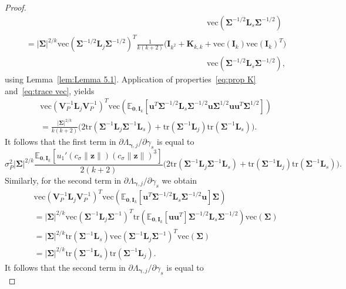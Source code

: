\documentclass{article}
\numberwithin{equation}{section}
\theoremstyle{plain}
\newcommand{\vc}{\mathrm{vec}}
\newcommand{\bgamma}{\bm\gamma}
\newcommand{\bSigma}{\mathbf{\Sigma}}
\newcommand{\bu}{\mathbf{u}}
\newcommand{\bz}{\mathbf{z}}
\newcommand{\bV}{\mathbf{V}}
\newcommand{\bI}{\mathbf{I}}
\newcommand{\bL}{\mathbf{L}}
\newcommand{\bK}{\mathbf{K}}
\newcommand{\E}{\mathbb{E}}
\begin{document}
\begin{proof}
\[\begin{split}
&\qquad\qquad\qquad\qquad\qquad\qquad\qquad\qquad\qquad\qquad\qquad
\vc\left(\bSigma^{-1/2}\bL_s\bSigma^{-1/2}\right)
\\
&=
|\bSigma|^{2/k}
\vc(\bSigma^{-1/2}\bL_j\bSigma^{-1/2})^T
\frac{1}{k(k+2)}
\Big(
\bI_{k^2}+\bK_{k,k}
+
\vc(\bI_k)\vc(\bI_k)^T
\Big)\\
&\qquad\qquad\qquad\qquad\qquad\qquad\qquad\qquad\qquad\qquad\qquad
\vc\left(\bSigma^{-1/2}\bL_s\bSigma^{-1/2}\right),
\end{split}
\]
using Lemma~\ref{lem:Lemma 5.1}.
Application of properties~\eqref{eq:prop K} and~\eqref{eq:trace vec}, yields
\[
\begin{split}
&
\vc(\bV_P^{-1}\bL_j\bV_P^{-1})^T
\vc\left(
\E_{\mathbf{0},\bI_k}
\left[
\bu^T\bSigma^{-1/2}\bL_s\bSigma^{-1/2}\bu
\bSigma^{1/2}\bu\bu^T\bSigma^{1/2}
\right]
\right)\\
&=
\frac{|\bSigma|^{2/k}}{k(k+2)}
\Big(
2\text{tr}(\bSigma^{-1}\bL_j\bSigma^{-1}\bL_s)
+
\text{tr}(\bSigma^{-1}\bL_j)\text{tr}(\bSigma^{-1}\bL_s)
\Big).
\end{split}
\]
It follows that the first term in $\partial\Lambda_{\bgamma,j}/\partial\gamma_s$ is equal to
\begin{equation}
\label{eq:first term}
\sigma_P^2
|\bSigma|^{2/k}
\frac{\E_{\mathbf{0},\bI_k}
\left[
u_1'(c_\sigma\|\bz\|)(c_\sigma\|\bz\|)^3
\right]}{2(k+2)}
\Big(
2\text{tr}(\bSigma^{-1}\bL_j\bSigma^{-1}\bL_s)+\text{tr}(\bSigma^{-1}\bL_j)\text{tr}(\bSigma^{-1}\bL_s)
\Big).
\end{equation}
Similarly, for the second term in $\partial\Lambda_{\bgamma,j}/\partial\gamma_s$
we obtain
\[
\begin{split}
&
\vc\left(\bV_P^{-1}\bL_j\bV_P^{-1}\right)^T
\vc\left(\E_{\mathbf{0},\bI_k}
\left[
\bu^T\bSigma^{-1/2}\bL_s\bSigma^{-1/2}\bu
\right]
\bSigma
\right)\\
&=
|\bSigma|^{2/k}
\vc\left(\bSigma^{-1}\bL_j\bSigma^{-1}\right)^T
\text{tr}
\left(
\E_{\mathbf{0},\bI_k}
\left[
\bu\bu^T
\right]
\bSigma^{-1/2}\bL_s\bSigma^{-1/2}
\right)
\vc\left(\bSigma\right)
\\
&=
|\bSigma|^{2/k}
\text{tr}(\bSigma^{-1}\bL_s)
\vc\left(\bSigma^{-1}\bL_j\bSigma^{-1}\right)^T
\vc\left(\bSigma\right)\\
&=
|\bSigma|^{2/k}
\text{tr}(\bSigma^{-1}\bL_s)
\text{tr}(\bSigma^{-1}\bL_j).
\end{split}
\]
It follows that the second term in $\partial\Lambda_{\bgamma,j}/\partial\gamma_s$ is equal to
\begin{equation}
\label{eq:second term}

\end{equation}
\end{proof}
\end{document}
